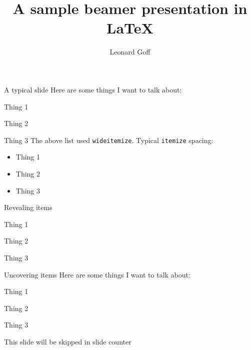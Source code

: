 \documentclass[10pt]{beamer}
\title{A sample beamer presentation in \LaTeX}
\author{Leonard Goff}
\institute[Columbia University] %
{
	ECONGU4999\\October 30 2019\\
	\bigskip \bigskip leonard.goff@columbia.edu
}
\date{}
\newenvironment{wideitemize}{\itemize\addtolength{\itemsep}{10pt}}{\enditemize}
\begin{document}
\begin{frame}
  \titlepage
\end{frame}

\begin{frame}{A typical slide}
	Here are some things I want to talk about:\\
	\vspace{.5cm}
	\begin{wideitemize}
		\item Thing 1
		\item Thing 2
		\item Thing 3
	\end{wideitemize}
	\vspace{1cm}
	The above list used \texttt{wideitemize}. Typical \texttt{itemize} spacing: 
	\begin{itemize}
		\item Thing 1
		\item Thing 2
		\item Thing 3
	\end{itemize}
\end{frame}


\begin{frame}{Revealing items}

	\begin{wideitemize}
		\item<1->{Thing 1}
		\item<2->{Thing 2}
		\item<3>{Thing 3}
	\end{wideitemize}
\end{frame}

\begin{frame}{Uncovering items}
	Here are some things I want to talk about:\\
	\vspace{.5cm}
	\begin{wideitemize}
	\item<1>Thing 1
	\item<2->Thing 2
	\item<3>Thing 3
	\end{wideitemize}
\end{frame}


\begin{frame}[noframenumbering]{}
	\centering \Large
	This slide will be skipped in slide counter
\end{frame}
\end{document}
